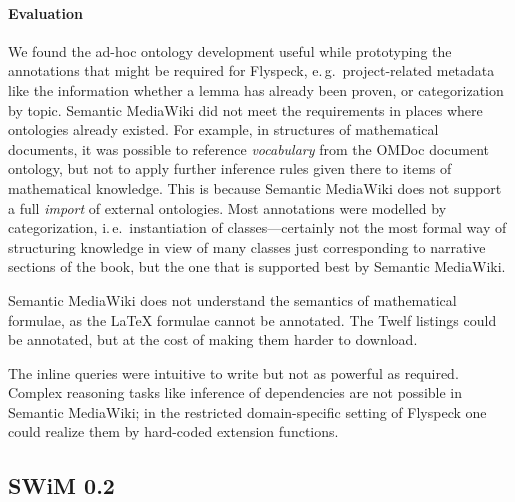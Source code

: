 \paragraph{Evaluation} We found the ad-hoc ontology development useful while
prototyping the annotations that might be required for Flyspeck, e.\,g.\
project-related metadata like the information whether a lemma has already been
proven, or categorization by topic.  Semantic MediaWiki did not meet the
requirements in places where ontologies already existed.  For example, in
structures of mathematical documents, it was possible to reference
\emph{vocabulary} from the OMDoc document ontology, but not to apply further
inference rules given there to items of mathematical knowledge.  This is because
Semantic MediaWiki does not support a full \emph{import} of external ontologies.
Most annotations were modelled by categorization, i.\,e.\ instantiation of
classes---certainly not the most formal way of structuring knowledge in view of
many classes just corresponding to narrative sections of the book, but the one
that is supported best by Semantic MediaWiki.

Semantic MediaWiki does not understand the semantics of mathematical formulae,
as the {\LaTeX} formulae cannot be annotated.  The Twelf listings could be
annotated, but at the cost of making them harder to download.

The inline queries were intuitive to write but not as powerful as required.
Complex reasoning tasks like inference of dependencies are not possible in
Semantic MediaWiki; in the restricted domain-specific setting of Flyspeck one
could realize them by hard-coded extension functions.

\subsection{SWiM 0.2}
\label{sec:swim}

